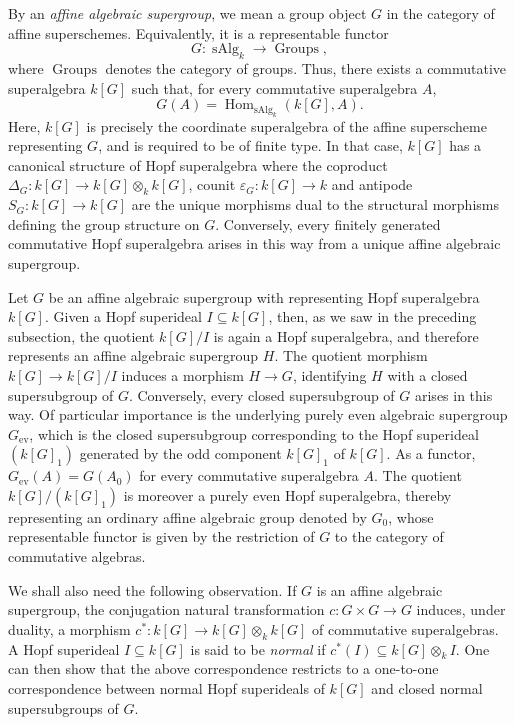\documentclass[11pt,a4paper,reqno,noamsfonts]{amsart}
\numberwithin{equation}{section}
\theoremstyle{definition}
\theoremstyle{remark}
\def\uev{{\mathrm{ev}}}
\DeclareMathOperator{\Hom}{Hom}
\DeclareMathOperator{\sAlg}{sAlg}
\DeclareMathOperator{\Groups}{Groups}
\begin{document}
By an \emph{affine algebraic supergroup}, we mean a group object $G$ in the category of affine superschemes. Equivalently, it is a representable functor 
\begin{equation}
G \colon \sAlg_{k} \longrightarrow \Groups,
\end{equation}
where $\Groups$ denotes the category of groups. Thus, there exists a commutative superalgebra $k[G]$ such that, for every commutative superalgebra $A$,
\begin{equation}
G(A) = \Hom_{\sAlg_k}(k[G],A).
\end{equation}
Here, $k[G]$ is precisely the coordinate superalgebra of the affine superscheme representing $G$, and is required to be of finite type. In that case, $k[G]$ has a canonical structure of Hopf superalgebra where the coproduct $\Delta_G \colon k[G] \to k[G] \otimes_k k[G]$, counit $\varepsilon_G \colon k[G] \to k$ and antipode $S_G \colon k[G] \to k[G]$ are the unique morphisms dual to the structural morphisms defining the group structure on $G$. Conversely, every finitely generated commutative Hopf superalgebra arises in this way from a unique affine algebraic supergroup.

Let $G$ be an affine algebraic supergroup with representing Hopf superalgebra $k[G]$. Given a Hopf superideal $I \subseteq k[G]$, then, as we saw in the preceding subsection, the quotient $k[G]/I$ is again a Hopf superalgebra, and therefore represents an affine algebraic supergroup $H$. The quotient morphism $k[G]\to k[G]/I$ induces a morphism $H\to G$, identifying $H$ with a closed  supersubgroup of $G$. Conversely, every closed supersubgroup of $G$ arises in this way. Of particular importance is the underlying purely even algebraic  supergroup $G_{\uev}$, which is the closed supersubgroup corresponding to the  Hopf superideal $(k[G]_1)$ generated by the odd component $k[G]_1$ of $k[G]$. As a functor, $G_{\uev}(A)=G(A_0)$ for every commutative superalgebra $A$. The quotient $k[G]/(k[G]_1)$ is moreover a purely even Hopf superalgebra, thereby representing an ordinary affine algebraic group denoted by $G_0$, whose representable functor is given by the restriction of $G$ to the category of  commutative algebras.

We shall also need the following observation. If $G$ is an affine algebraic supergroup, the conjugation natural transformation $c \colon G \times G \to G$ induces, under duality, a morphism $c^{*} \colon k[G] \to k[G] \otimes_k k[G]$ of commutative superalgebras. A Hopf superideal $I \subseteq k[G]$ is said to be \emph{normal} if $c^{*}(I) \subseteq k[G] \otimes_k I$.  One can then show that the above correspondence restricts to a one-to-one correspondence between normal Hopf superideals of $k[G]$ and closed normal supersubgroups of $G$. 
\end{document}
